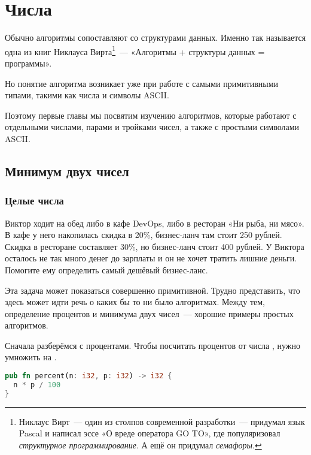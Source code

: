 \chapter{Числа}

Обычно алгоритмы сопоставляют со структурами данных.
Именно так называется одна из книг Никлауса Вирта\footnote{
  Никлаус Вирт~--- один из столпов современной разработки~--- придумал язык Pascal и написал эссе «О вреде оператора GO TO», где популяризовал {\em структурное программирование}.
  А ещё он придумал {\em семафоры}.
}~--- «Алгоритмы + структуры данных = программы».

Но понятие алгоритма возникает уже при работе с самыми примитивными типами, такими как числа и символы ASCII.

Поэтому первые главы мы посвятим изучению алгоритмов, которые работают с отдельными числами, парами и тройками чисел, а также с простыми символами ASCII.

\section{Минимум двух чисел}

\subsection{Целые числа}

\begin{Exercise}
  \Question
  Виктор ходит на обед либо в кафе DevOps, либо в ресторан «Ни рыба, ни мясо».
  В кафе у него накопилась скидка в 20\%, бизнес-ланч там стоит 250 рублей.
  Скидка в ресторане составляет 30\%, но бизнес-ланч стоит 400 рублей.
  У Виктора осталось не так много денег до зарплаты и он не хочет тратить лишние деньги.
  Помогите ему определить самый дешёвый бизнес-ланс.
\end{Exercise}

Эта задача может показаться совершенно примитивной.
Трудно представить, что здесь может идти речь о каких бы то ни было алгоритмах.
Между тем, определение процентов и минимума двух чисел~--- хорошие примеры простых алгоритмов.

Сначала разберёмся с процентами.
Чтобы посчитать  процентов от числа , нужно  умножить на .

\begin{lstlisting}[language=Rust]
pub fn percent(n: i32, p: i32) -> i32 {
  n * p / 100
}
\end{lstlisting}

